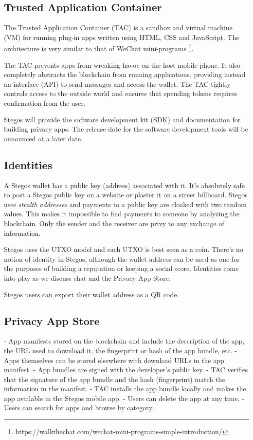 \documentclass[a4paper, 10pt, conference]{ieeeconf}
\begin{document}
\subsection{Trusted Application Container}\label{TAC}
The Trusted Application Container (TAC) is a sandbox and virtual machine (VM) for running plug-in apps written using HTML, CSS and JavaScript. The architecture is very similar to that of WeChat mini-programs \footnote{https://walkthechat.com/wechat-mini-programs-simple-introduction/}.

The TAC prevents apps from wreaking havoc on the host mobile phone. It also completely abstracts the blockchain from running applications, providing instead an interface (API) to send messages and access the wallet. The TAC tightly controls access to the outside world and ensures that spending tokens requires confirmation from the user. 

Stegos will provide the software development kit (SDK) and documentation for building privacy apps. The release date for the software development tools will be announced at a later date.

\subsection{Identities}\label{Identities}
A Stegos wallet has a public key (address) associated with it. It's absolutely safe to post a Stegos public key on a website or plaster it on a street billboard. Stegos uses \textit{stealth addresses} and payments to a public key are cloaked with two random values. This makes it impossible to find payments to someone by analyzing the blockchain. Only the sender and the receiver are privy to any exchange of information. 

Stegos uses the UTXO model and each UTXO is best seen as a coin. There's no notion of identity in Stegos, although the wallet address can be used as one for the purposes of building a reputation or keeping a social score. Identities come into play as we discuss chat and the Privacy App Store. 
 
Stegos users can export their wallet address as a QR code. 
 
\subsection{Privacy App Store}
 
- App manifests stored on the blockchain and include the description of the app, the URL used to download it, the fingerprint or hash of the app bundle, etc. 
- Apps themselves can be stored elsewhere with download URLs in the app manifest.
- App bundles are signed with the developer's public key.
- TAC verifies that the signature of the app bundle and the hash (fingerprint) match the information in the manifest.
- TAC installs the app bundle locally and makes the app available in the Stegos mobile app.
- Users can delete the app at any time.
- Users can search for apps and browse by category. 
\end{document}
